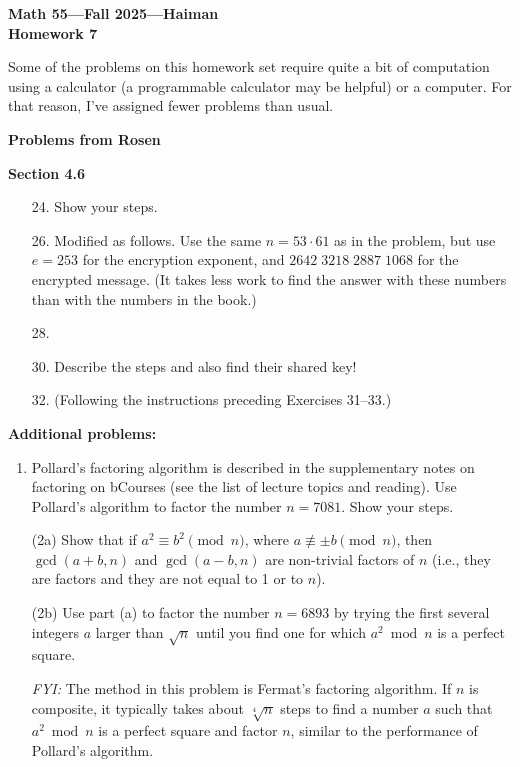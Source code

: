 \documentclass{article}
\begin{document}
\begin{center}
    \textbf{\LARGE Math 55—Fall 2025—Haiman} \\[6pt]
    \textbf{\Large Homework 7} \\[6pt]
\end{center}

\vspace{1em}

\bigskip

Some of the problems on this homework set require quite a bit of computation using a calculator (a programmable calculator may be helpful) or a computer. For that reason, I’ve assigned fewer problems than usual.

\bigskip

\noindent \textbf{Problems from Rosen}

\medskip

\noindent \textbf{Section 4.6}
\begin{itemize}
    \item[24.] Show your steps.

    \item[26.] Modified as follows. Use the same $n = 53 \cdot 61$ as in the problem, but use $e = 253$ for the encryption exponent, and $2642\;3218\;2887\;1068$ for the encrypted message. (It takes less work to find the answer with these numbers than with the numbers in the book.)

    \item[28.]

    \item[30.] Describe the steps and also find their shared key!

    \item[32.] (Following the instructions preceding Exercises 31–33.)
\end{itemize}

\bigskip

\noindent \textbf{Additional problems:}

\begin{enumerate}
    \item Pollard’s factoring algorithm is described in the supplementary notes on factoring on bCourses (see the list of lecture topics and reading). Use Pollard’s algorithm to factor the number $n = 7081$. Show your steps.

    \item[(2a)] Show that if $a^2 \equiv b^2 \pmod{n}$, where $a \not\equiv \pm b \pmod{n}$, then $\gcd(a+b,n)$ and $\gcd(a-b,n)$ are non-trivial factors of $n$ (i.e., they are factors and they are not equal to 1 or to $n$).

    \item[(2b)] Use part (a) to factor the number $n = 6893$ by trying the first several integers $a$ larger than $\sqrt{n}$ until you find one for which $a^2 \bmod n$ is a perfect square.

    \medskip
    \textit{FYI:} The method in this problem is Fermat’s factoring algorithm. If $n$ is composite, it typically takes about $\sqrt[4]{n}$ steps to find a number $a$ such that $a^2 \bmod n$ is a perfect square and factor $n$, similar to the performance of Pollard’s algorithm.
\end{enumerate}
\end{document}
